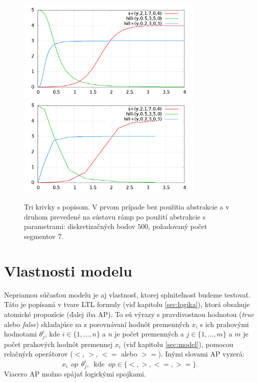 \documentclass[11pt,final,oneside]{fithesis}
\begin{document}
\begin{figure}[h]
    \centering
    \includegraphics[width=0.80\textwidth]{abstractNO}
    \includegraphics[width=0.80\textwidth]{abstractYES}
    \caption{Tri krivky s popisom. V prvom pr\'ipade bez pou\v zitia abstrakcie a v druhom preveden\'e na s\'ustavu r\'amp po pou\v zit\'i abstrakcie 
    s parametrami: diskretiza\v cn\'ych bodov $500$, po\v zadovan\'y po\v cet segmentov $7$.}
	\label{fig:noabstract}
\end{figure}

\section{Vlastnosti modelu}
Nepriamou s\'u\v cas\v tou modelu je aj vlastnos\v t, ktorej splnite\v lnos\v t budeme testova\v t. T\'ato je pop\'isan\'a v tvare LTL formuly (vi\v d
kapitolu \ref{sec:logika}), ktor\'a obsahuje atomick\'e propoz\'icie (\v dalej iba AP). To s\'u v\'yrazy s pravdivostnou hodnotou ({\it true} alebo 
{\it false}) skladaj\'uce sa z porovn\'avan\'i hodn\^ ot premenn\'ych $x_i$ s ich prahov\'ymi hodnotami $\theta^i_j$, kde $i \in \{1,\dots{},n\}$ a $n$ je 
po\v cet premenn\'ych a $j \in \{1,\dots{},m\}$ a $m$ je po\v cet prahov\'ych hodn\^ ot premennej $x_i$ (vi\v d kapitolu \ref{sec:model}), 
pomocou rela\v cn\'ych oper\'atorov ($<$, $>$, $<=$ alebo $>=$). In\'ymi slovami AP vyzer\'a: 
\begin{equation*}
x_i\ \ op \ \ \theta^i_j, \ \textrm{ kde } \ op \in \{<,>,<=,>=\}.
\end{equation*}
Viacero AP mo\v zno sp\'aja\v t logick\'ymi spojkami.
\end{document}
